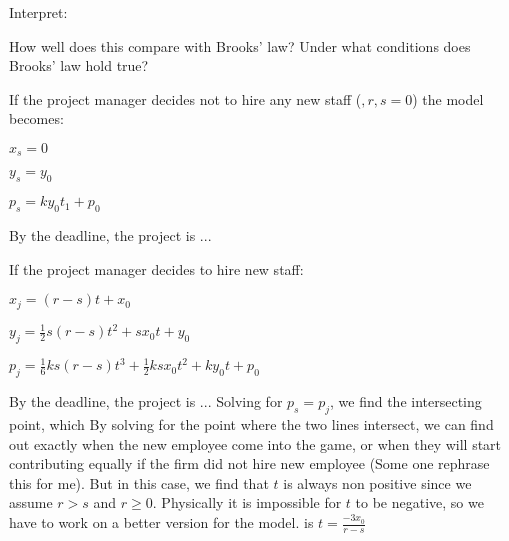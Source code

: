 \documentclass{article}
\newenvironment{atomize}
    {\begin{list} {} {
            \setlength\itemindent{0pt}
            \setlength\leftmargin{10pt}
            \setlength\labelwidth{0pt}
    }}
    {\end{list}}
\begin{document}
\begin{atomize}
    \item Interpret:
  		\begin{atomize}
				\item How well does this compare with Brooks' law?  Under what
				conditions does Brooks' law hold true?
  			\item
				  \begin{itemize}
				    \item If the project manager decides not to hire any new
				    staff ($,r,s = 0$) the model becomes:
				    \begin{atomize}
				    	\item $x_{s} = 0$
				    	\item $y_{s} = y_{0}$
				    	\item $p_{s} = ky_{0}t_{1} + p_{0}$
				    \end{atomize}
				    By the deadline, the project is ...
				
				    \item If the project manager decides to hire new staff:
				    \begin{atomize}
				    \item $x_{j} = \left(r - s\right)t + x_{0}$
						\item $y_{j} = \frac{1}{2}s\left(r - s\right)t^{2} + sx_{0}t +
						y_{0}$
						\item $p_{j} = \frac{1}{6}ks(r-s)t^{3} + \frac{1}{2}ksx_{0}t^{2} +
						ky_{0}t + p_{0}$
				    \end{atomize}
						By the deadline, the project is ...  Solving for $p_{s}=p_{j}$, we
						find the intersecting point, which By solving for the point where
						the two lines intersect, we can find out exactly when the new
						employee come into the game, or when they will start contributing
						equally if the firm did not hire new employee (Some one rephrase
						this for me). But in this case, we find that $t$ is always non
						positive since we assume $r>s$ and $r\geq0$.  Physically it is
						impossible for $t$ to be negative, so we have to work on a better
						version for the model.  is $t=\frac{-3x_{0}}{r-s}$
				  	\end{itemize}	
  	\end{atomize}
  \end{atomize}
\end{document}
